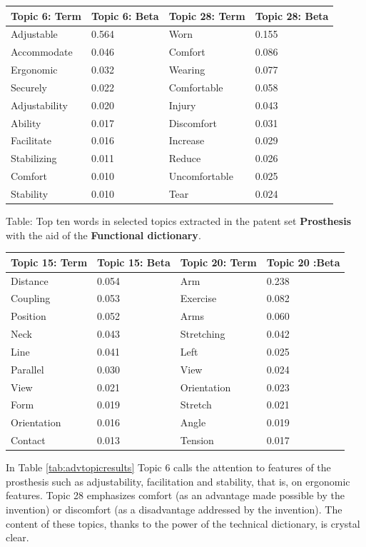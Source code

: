 \documentclass[]{book}
\begin{document}
\begin{tabular}{l|l|l|l}
\hline
Topic 6: Term & Topic 6: Beta & Topic 28: Term & Topic 28: Beta\\
\hline
Adjustable & 0.564 & Worn & 0.155\\
\hline
Accommodate & 0.046 & Comfort & 0.086\\
\hline
Ergonomic & 0.032 & Wearing & 0.077\\
\hline
Securely & 0.022 & Comfortable & 0.058\\
\hline
Adjustability & 0.020 & Injury & 0.043\\
\hline
Ability & 0.017 & Discomfort & 0.031\\
\hline
Facilitate & 0.016 & Increase & 0.029\\
\hline
Stabilizing & 0.011 & Reduce & 0.026\\
\hline
Comfort & 0.010 & Uncomfortable & 0.025\\
\hline
Stability & 0.010 & Tear & 0.024\\
\hline
\end{tabular}

Table: \label{tab:functtopicresults} Top ten words in selected topics
extracted in the patent set \textbf{Prosthesis} with the aid of the
\textbf{Functional dictionary}.

\begin{tabular}{l|l|l|l}
\hline
Topic 15: Term & Topic 15: Beta & Topic 20: Term & Topic 20 :Beta\\
\hline
Distance & 0.054 & Arm & 0.238\\
\hline
Coupling & 0.053 & Exercise & 0.082\\
\hline
Position & 0.052 & Arms & 0.060\\
\hline
Neck & 0.043 & Stretching & 0.042\\
\hline
Line & 0.041 & Left & 0.025\\
\hline
Parallel & 0.030 & View & 0.024\\
\hline
View & 0.021 & Orientation & 0.023\\
\hline
Form & 0.019 & Stretch & 0.021\\
\hline
Orientation & 0.016 & Angle & 0.019\\
\hline
Contact & 0.013 & Tension & 0.017\\
\hline
\end{tabular}

In Table \ref{tab:advtopicresults} Topic 6 calls the attention to
features of the prosthesis such as adjustability, facilitation and
stability, that is, on ergonomic features. Topic 28 emphasizes comfort
(as an advantage made possible by the invention) or discomfort (as a
disadvantage addressed by the invention). The content of these topics,
thanks to the power of the technical dictionary, is crystal clear.
\end{document}
